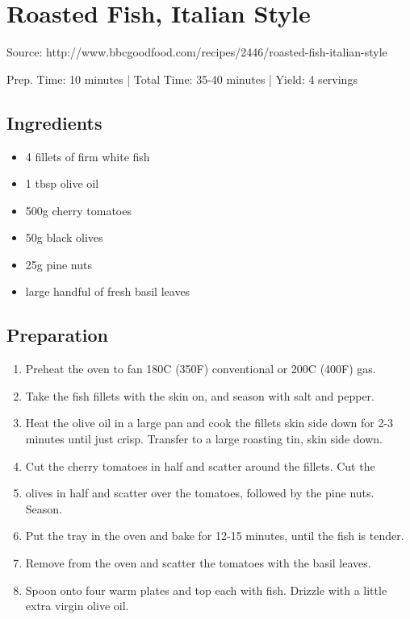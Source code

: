 \section{Roasted Fish, Italian Style}

Source: http://www.bbcgoodfood.com/recipes/2446/roasted-fish-italian-style

\begin{center}
Prep. Time: 10 minutes |
Total Time: 35-40 minutes | 
Yield: 4 servings
\end{center}

\subsection{Ingredients}
\begin{multicols}{2}
\begin{itemize}
    \item 4 fillets of firm white fish
    \item 1 tbsp olive oil 
    \item 500g cherry tomatoes 
    \item 50g black olives 
    \item 25g pine nuts 
    \item large handful of fresh basil leaves
\end{itemize}
\end{multicols}

\subsection{Preparation}
\begin{enumerate}
    \item Preheat the oven to fan 180C (350F) conventional or 200C (400F) gas.
    \item Take the fish fillets with the skin on, and season with salt and pepper.
    \item Heat the olive oil in a large pan and cook the fillets skin side down for 2-3 minutes until just crisp. Transfer to a large roasting tin, skin side down.
    \item Cut the cherry tomatoes in half and scatter around the fillets. Cut the
    \item olives in half and scatter over the tomatoes, followed by the pine nuts. Season.
    \item Put the tray in the oven and bake for 12-15 minutes, until the fish is tender. 
    \item Remove from the oven and scatter the tomatoes with the basil leaves.
    \item Spoon onto four warm plates and top each with fish. Drizzle with a little extra virgin olive oil.
\end{enumerate}


